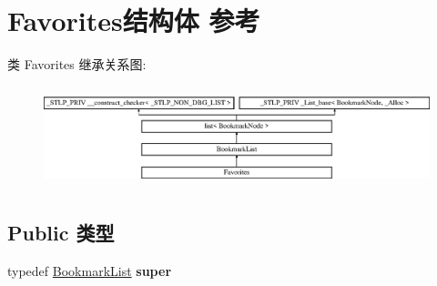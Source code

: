 \hypertarget{struct_favorites}{}\section{Favorites结构体 参考}
\label{struct_favorites}
类 Favorites 继承关系图\+:\begin{figure}[H]
\begin{center}
\leavevmode
\includegraphics[height=2.970822cm]{struct_favorites}
\end{center}
\end{figure}
\subsection*{Public 类型}
\begin{DoxyCompactItemize}
\item 
\mbox{\label{struct_favorites_af9cc07d43d88a48855c3b80a91d594cd}} 
typedef \hyperlink{struct_bookmark_list}{Bookmark\+List} {\bfseries super}
\end{DoxyCompactItemize}
